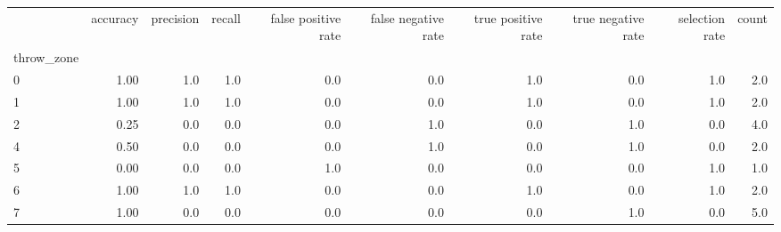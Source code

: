 \begin{tabular}{lrrrrrrrrr}
\toprule
{} &  accuracy &  precision &  recall &  false positive rate &  false negative rate &  true positive rate &  true negative rate &  selection rate &  count \\
throw\_zone &           &            &         &                      &                      &                     &                     &                 &        \\
\midrule
0          &      1.00 &        1.0 &     1.0 &                  0.0 &                  0.0 &                 1.0 &                 0.0 &             1.0 &    2.0 \\
1          &      1.00 &        1.0 &     1.0 &                  0.0 &                  0.0 &                 1.0 &                 0.0 &             1.0 &    2.0 \\
2          &      0.25 &        0.0 &     0.0 &                  0.0 &                  1.0 &                 0.0 &                 1.0 &             0.0 &    4.0 \\
4          &      0.50 &        0.0 &     0.0 &                  0.0 &                  1.0 &                 0.0 &                 1.0 &             0.0 &    2.0 \\
5          &      0.00 &        0.0 &     0.0 &                  1.0 &                  0.0 &                 0.0 &                 0.0 &             1.0 &    1.0 \\
6          &      1.00 &        1.0 &     1.0 &                  0.0 &                  0.0 &                 1.0 &                 0.0 &             1.0 &    2.0 \\
7          &      1.00 &        0.0 &     0.0 &                  0.0 &                  0.0 &                 0.0 &                 1.0 &             0.0 &    5.0 \\
\bottomrule
\end{tabular}
